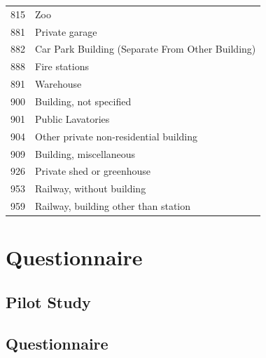 \documentclass[table,a4paper,oneside]{book}
\begin{document}
\begin{singlespace}
\begin{longtable}{|l|p{11cm}|}
\rowcolor{lightgray} 815	&Zoo	\\
881	&Private garage	\\
\rowcolor{lightgray} 882	&Car Park Building (Separate From Other Building)\\
888	&Fire stations	\\
\rowcolor{lightgray} 891	&Warehouse	\\
900	&Building, not specified	\\
\rowcolor{lightgray} 901	&Public Lavatories	\\
904	&Other private non-residential building	\\
\rowcolor{lightgray} 909	&Building, miscellaneous	\\
926	&Private shed or greenhouse	\\
\rowcolor{lightgray} 953	&Railway, without building	\\
959	&Railway, building other than station\\
\end{longtable}

\chapter{Questionnaire}
\label{app:Questionnaire}

\section{Pilot Study}
\label{app:Pilot Study}


\newpage
\section{Questionnaire}
\label{app:Questionnaire}





\end{singlespace}
\end{document}
